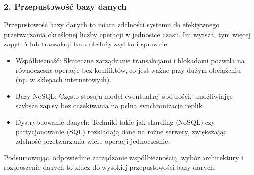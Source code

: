 \documentclass[a4paper,11pt,openany,english]{sphinxmanual}
\begin{document}
\subsubsection{2. Przepustowość bazy danych}
\label{\detokenize{rozdzial2/Wydajnosc-Skalowanie-i-Replikacja/index:przepustowosc-bazy-danych}}
\sphinxAtStartPar
Przepustowość bazy danych to miara zdolności systemu do efektywnego przetwarzania określonej liczby operacji w jednostce czasu. Im wyższa, tym więcej zapytań lub transakcji baza obsłuży szybko i sprawnie.
\begin{description}
\begin{itemize}
\item {} 
\sphinxAtStartPar
Współbieżność: Skuteczne zarządzanie transakcjami i blokadami pozwala na równoczesne operacje bez konfliktów, co jest ważne przy dużym obciążeniu (np. w sklepach internetowych).

\item {} 
\sphinxAtStartPar
Bazy NoSQL: Często stosują model ewentualnej spójności, umożliwiając szybsze zapisy bez oczekiwania na pełną synchronizację replik.

\item {} 
\sphinxAtStartPar
Dystrybuowanie danych: Techniki takie jak sharding (NoSQL) czy partycjonowanie (SQL) rozkładają dane na różne serwery, zwiększając zdolność przetwarzania wielu operacji jednocześnie.

\end{itemize}

\end{description}

\sphinxAtStartPar
Podsumowując, odpowiednie zarządzanie współbieżnością, wybór architektury i rozproszenie danych to klucz do wysokiej przepustowości bazy danych.
\end{document}
